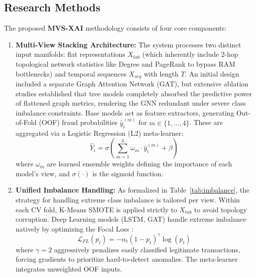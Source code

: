 \documentclass[10pt,a4paper,twocolumn]{article}
\begin{document}
\subsection{Research Methods}\label{sec:methods}
The proposed \textbf{MVS-XAI} methodology consists of four core components:
\begin{enumerate}
    \item \textbf{Multi-View Stacking Architecture:} The system processes two distinct input manifolds: flat representations $X_{tab}$ (which inherently include 2-hop topological network statistics like Degree and PageRank to bypass RAM bottlenecks) and temporal sequences $X_{seq}$ with length $T$. An initial design included a separate Graph Attention Network (GAT), but extensive ablation studies established that tree models completely absorbed the predictive power of flattened graph metrics, rendering the GNN redundant under severe class imbalance constraints. Base models act as feature extractors, generating Out-of-Fold (OOF) fraud probabilities $\hat{y}_i^{(m)}$ for $m \in \{1,\dots,4\}$. These are aggregated via a Logistic Regression (L2) meta-learner:
    \begin{equation}
    \hat{Y}_i = \sigma \left( \sum_{m=1}^{4} \omega_m \cdot \hat{y}_i^{(m)} + \beta \right)
    \end{equation}
    where $\omega_m$ are learned ensemble weights defining the importance of each model's view, and $\sigma(\cdot)$ is the sigmoid function.
    \item \textbf{Unified Imbalance Handling:} As formalized in Table~\ref{tab:imbalance}, the strategy for handling extreme class imbalance is tailored per view. Within each CV fold, K-Means SMOTE is applied strictly to $X_{tab}$ to avoid topology corruption. Deep Learning models (LSTM, GAT) handle extreme imbalance natively by optimizing the Focal Loss \cite{lin2017focal}:
    \begin{equation}
    \mathcal{L}_{FL}(p_t) = -\alpha_t (1 - p_t)^\gamma \log(p_t)
    \end{equation}
    where $\gamma = 2$ aggressively penalizes easily classified legitimate transactions, forcing gradients to prioritize hard-to-detect anomalies. The meta-learner integrates unweighted OOF inputs.
    

\end{enumerate}
\end{document}
